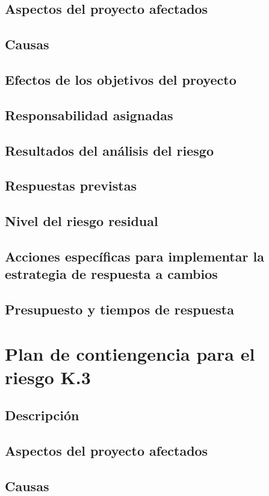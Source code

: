\documentclass[11pt,a4paper,spanish,twoside]{book}
\begin{document}
\subsection{Aspectos del proyecto afectados}
\subsection{Causas}
\subsection{Efectos de los objetivos del proyecto}
\subsection{Responsabilidad asignadas}
\subsection{Resultados del análisis del riesgo}
\subsection{Respuestas previstas}
\subsection{Nivel del riesgo residual}
\subsection{Acciones específicas para implementar la estrategia de respuesta
a cambios}
\subsection{Presupuesto y tiempos de respuesta}

\section{Plan de contiengencia para el riesgo K.3}
\subsection{Descripción}
\subsection{Aspectos del proyecto afectados}
\subsection{Causas}
\end{document}

